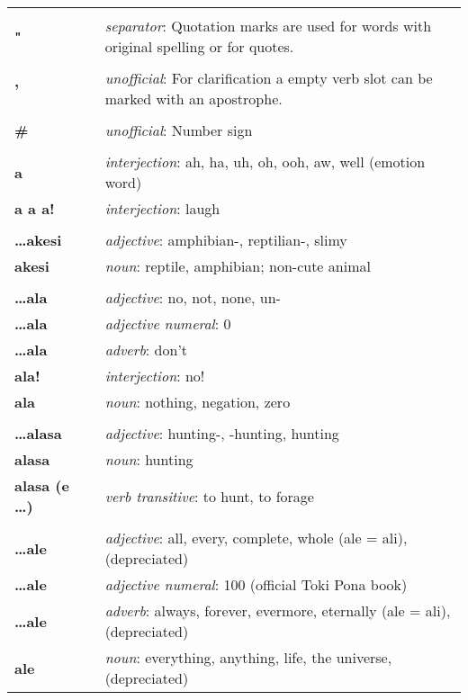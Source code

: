 \begin{supertabular}{p{2,5cm}|ll}
 && \\ %
\textbf{"} && \textit{separator}: Quotation marks are used for words with original spelling or for quotes. \\ 
 && \\ %
\textbf{'} && \textit{unofficial}: For clarification a empty verb slot can be marked with an apostrophe.   \\ 
 && \\ %
\textbf{\#} && \textit{unofficial}: Number sign  \\ 
 && \\ %
\textbf{a} && \textit{interjection}: ah, ha, uh, oh, ooh, aw, well (emotion word) \\ 
\textbf{a a a!} && \textit{interjection}: laugh \\ 
 && \\ %
\textbf{\dots akesi} && \textit{adjective}: amphibian-, reptilian-, slimy \\ 
\textbf{akesi} && \textit{noun}: reptile, amphibian; non-cute animal \\ 
 && \\ %
\textbf{\dots ala} && \textit{adjective}: no, not, none, un- \\ 
\textbf{\dots ala} && \textit{adjective numeral}: 0 \\ 
\textbf{\dots ala} && \textit{adverb}: don't \\ 
\textbf{ala!} && \textit{interjection}: no! \\ 
\textbf{ala} && \textit{noun}: nothing, negation, zero \\ 
 && \\ %
\textbf{\dots alasa} && \textit{adjective}: hunting-, -hunting, hunting \\ 
\textbf{alasa} && \textit{noun}: hunting \\ 
\textbf{alasa (e \dots)} && \textit{verb transitive}: to hunt, to forage \\ 
 && \\ %
\textbf{\dots ale} && \textit{adjective}: all, every, complete, whole (ale = ali), (depreciated) \\ 
\textbf{\dots ale} && \textit{adjective numeral}: 100 (official Toki Pona book) \\ 
\textbf{\dots ale} && \textit{adverb}: always, forever, evermore, eternally (ale = ali), (depreciated) \\ 
\textbf{ale} && \textit{noun}: everything, anything, life, the universe, (depreciated) \\ 

\end{supertabular}
